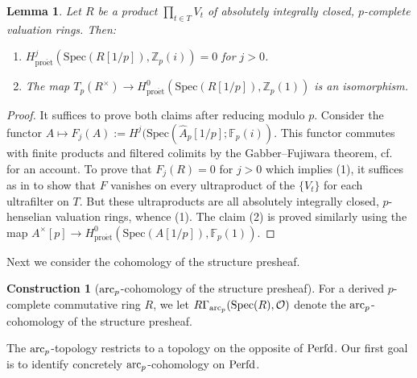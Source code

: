 \documentclass{amsart}
\newcommand{\proet}{\mathrm{pro\acute{e}t}}
\newtheorem{lemma}[theorem]{Lemma}
\theoremstyle{definition}
\newtheorem{construction}[theorem]{Construction}
\newcommand{\spec}{\mathrm{Spec}}
\begin{document}
\begin{lemma} 
Let $R$ be a product $\prod_{t \in T} V_t $ of  absolutely integrally
closed, $p$-complete valuation
rings. 
Then: 
\begin{enumerate}
\item $H^j_{\proet}( \spec(R[1/p]), \mathbb{Z}_p(i)) = 0$ for $ j > 0$. 
\item
The map 
$T_p(R^{\times}) \to 
H^0_{\proet}( \spec(R[1/p]), \mathbb{Z}_p(1)) $ is an isomorphism. 
\end{enumerate}
\label{padicnearbyproductval}
\end{lemma} 
\begin{proof} 
It suffices to prove both claims after reducing modulo $p$. 
Consider the functor 
$A \mapsto F_j(A) := H^j( \spec(\hat{A}_p[1/p]; \mathbb{F}_p(i))$. 
This functor commutes with finite products and filtered colimits by the
Gabber--Fujiwara theorem, cf.~\cite[Th.~6.11]{BM18} for an account. 
To prove 
that $F_j(R) = 0$ for $j > 0$
which implies 
(1), 
it suffices 
as in \cite[Cor.~3.17]{BM18}
to show that $F$
vanishes on every ultraproduct of the $\{V_t\}$ for each ultrafilter on $T$. 
But these ultraproducts are all absolutely integrally closed,
$p$-henselian valuation rings, whence (1). The claim (2) is proved similarly
using the map $A^{\times}[p]  \to 
H^0_{\proet}( \spec(A[1/p]), \mathbb{F}_p(1))$. 
\end{proof} 

Next we consider the cohomology of the structure presheaf. 


\begin{construction}[$\mathrm{arc}_{{p}}$-cohomology of the structure presheaf] 
For a derived $p$-complete commutative ring $R$, we let $R \Gamma_{\arc}( \spec(R), \mathcal{O})$
denote the 
$\mathrm{arc}_{{p}}$-cohomology of the structure presheaf. 
\end{construction} 







The $\mathrm{arc}_{{p}}$-topology restricts to a topology on the opposite of $\mathrm{Perfd}$. 
Our first goal is to identify concretely $\mathrm{arc}_{{p}}$-cohomology on $\mathrm{Perfd}$. 
\end{document}
